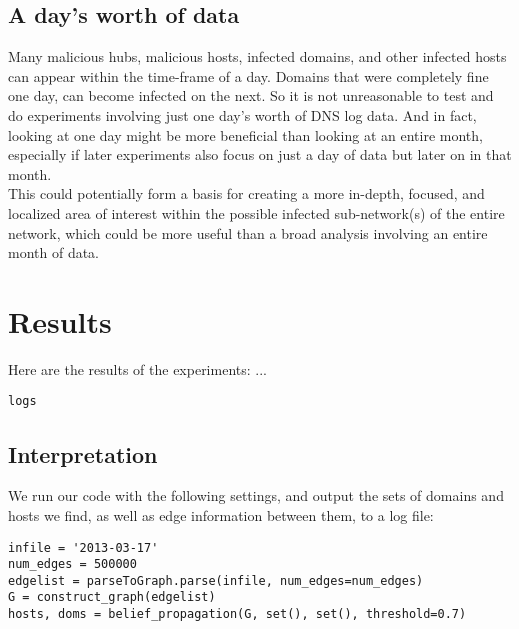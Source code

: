 \documentclass{article} %
\begin{document}
\subsection{A day's worth of data}
Many malicious hubs, malicious hosts, infected domains, and other infected hosts can appear within the time-frame of a day. Domains that were completely fine one day, can become infected on the next. So it is not unreasonable to test
and do experiments involving just one day's worth of DNS log data. And in fact, looking at one day might be more beneficial than looking at an entire month, especially if later experiments also focus on just a day of data but later on 
in that month. \\
This could potentially form a basis for creating a more in-depth, focused, and localized area of interest within the possible infected sub-network(s) of the entire network, which could be more useful than a broad analysis
involving an entire month of data.

\section{Results}
\label{res}
Here are the results of the experiments:
...

\begin{verbatim}
logs
\end{verbatim}

\subsection{Interpretation}
We run our code with the following settings, and output the sets of domains and hosts we find, as well as edge information between them, to a log file:
\begin{lstlisting}
infile = '2013-03-17'
num_edges = 500000
edgelist = parseToGraph.parse(infile, num_edges=num_edges)
G = construct_graph(edgelist)
hosts, doms = belief_propagation(G, set(), set(), threshold=0.7)
\end{lstlisting}
\end{document}
